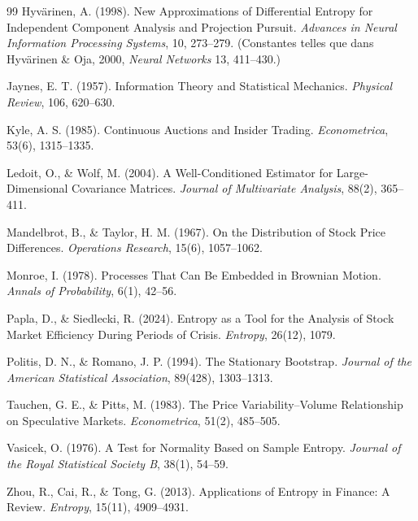 \begin{thebibliography}{99}
 Hyvärinen, A. (1998). New Approximations of Differential Entropy for Independent Component Analysis and Projection Pursuit. \textit{Advances in Neural Information Processing Systems}, 10, 273--279. (Constantes telles que dans Hyvärinen \& Oja, 2000, \textit{Neural Networks} 13, 411--430.)

 Jaynes, E. T. (1957). Information Theory and Statistical Mechanics. \textit{Physical Review}, 106, 620--630.

 Kyle, A. S. (1985). Continuous Auctions and Insider Trading. \textit{Econometrica}, 53(6), 1315--1335.

 Ledoit, O., \& Wolf, M. (2004). A Well-Conditioned Estimator for Large-Dimensional Covariance Matrices. \textit{Journal of Multivariate Analysis}, 88(2), 365--411.

 Mandelbrot, B., \& Taylor, H. M. (1967). On the Distribution of Stock Price Differences. \textit{Operations Research}, 15(6), 1057--1062.

 Monroe, I. (1978). Processes That Can Be Embedded in Brownian Motion. \textit{Annals of Probability}, 6(1), 42--56.

 Papla, D., \& Siedlecki, R. (2024). Entropy as a Tool for the Analysis of Stock Market Efficiency During Periods of Crisis. \textit{Entropy}, 26(12), 1079.

 Politis, D. N., \& Romano, J. P. (1994). The Stationary Bootstrap. \textit{Journal of the American Statistical Association}, 89(428), 1303--1313.

 Tauchen, G. E., \& Pitts, M. (1983). The Price Variability--Volume Relationship on Speculative Markets. \textit{Econometrica}, 51(2), 485--505.

 Vasicek, O. (1976). A Test for Normality Based on Sample Entropy. \textit{Journal of the Royal Statistical Society B}, 38(1), 54--59.

 Zhou, R., Cai, R., \& Tong, G. (2013). Applications of Entropy in Finance: A Review. \textit{Entropy}, 15(11), 4909--4931.

\end{thebibliography}



